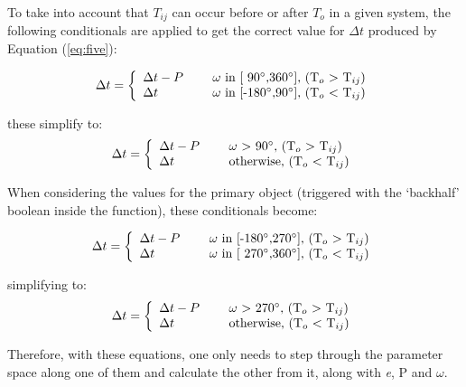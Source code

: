 \documentclass[12pt,preprint]{aastex}
\begin{document}
To take into account that $T_{ij}$ can occur before or after $T_{o}$ in a given system, the following conditionals are applied to get the correct value for $\Delta t$ produced by Equation (\ref{eq:five}):

\begin{equation}\label{eq:ToTcCorrections1a}
\Delta t = \left\{ \begin{array}{l l} \Delta t-P& \quad \text{ $\omega$ in [ 90$^{\circ}$,360$^{\circ}$], (T$_o$ $>$ T$_{ij}$)}\\  \Delta t& \quad \text{ $\omega$ in [-180$^{\circ}$,90$^{\circ}$], (T$_o$ $<$ T$_{ij}$)} \end{array} \right.
\end{equation}

these simplify to:
\begin{equation}\label{eq:ToTcCorrections1b}
\Delta t = \left\{ \begin{array}{l l} \Delta t-P& \quad \text{ $\omega$ $>$ 90$^{\circ}$, (T$_o$ $>$ T$_{ij}$)}\\  \Delta t& \quad \text{ otherwise, (T$_o$ $<$ T$_{ij}$)} \end{array} \right.
\end{equation}

When considering the values for the primary object (triggered with the `backhalf' boolean inside the function), these conditionals become:

\begin{equation}\label{eq:ToTcCorrections2a}
\Delta t = \left\{ \begin{array}{l l} \Delta t-P& \quad \text{ $\omega$ in [-180$^{\circ}$,270$^{\circ}$], (T$_o$ $>$ T$_{ij}$)}\\  \Delta t& \quad \text{ $\omega$ in [ 270$^{\circ}$,360$^{\circ}$], (T$_o$ $<$ T$_{ij}$)} \end{array} \right.
\end{equation}

simplifying to:
\begin{equation}\label{eq:ToTcCorrections2b}
\Delta t = \left\{ \begin{array}{l l} \Delta t-P& \quad \text{ $\omega$ $>$ 270$^{\circ}$, (T$_o$ $>$ T$_{ij}$)}\\  \Delta t& \quad \text{ otherwise, (T$_o$ $<$ T$_{ij}$)} \end{array} \right.
\end{equation}

Therefore, with these equations, one only needs to step through the parameter space along one of them and calculate the other from it, along with {\it e}, P and $\omega$.
\end{document}
